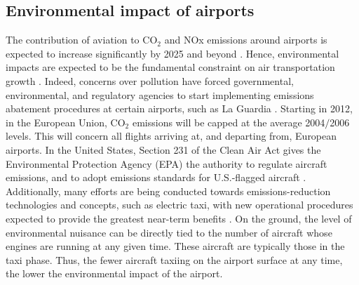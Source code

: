 \documentclass[letterpaper]{article}
\begin{document}
\subsection{Environmental impact of airports}
The contribution of aviation to CO$_{2}$ and NOx emissions around airports is expected to increase
 significantly by 2025 and beyond \cite{U.S.1999,Intergovernmental1999}. Hence, environmental impacts
 are expected to be the fundamental constraint on air transportation growth \cite{Waitz2004}.
  Indeed, concerns over pollution have forced governmental, environmental, and regulatory agencies to
   start implementing emissions abatement procedures at certain airports, such as La Guardia \cite{Boeing}.
   Starting in 2012, in the European Union, CO$_{2}$ emissions will be capped at the average 2004$/$2006 levels.
   This will concern all flights arriving at, and departing from, European airports.
   In the United States, Section 231 of the Clean Air Act gives the Environmental Protection Agency (EPA)
   the authority to regulate aircraft emissions, and to adopt emissions standards for U.S.-flagged aircraft \cite{United2003}.
   Additionally, many efforts are being conducted towards emissions-reduction technologies and concepts, such as electric taxi, with new operational
   procedures expected to provide the greatest near-term benefits \cite{Waitz2004}. On the ground, the level of environmental nuisance can be directly tied to the number of aircraft whose engines are running at any given time. These aircraft are typically those in the taxi phase. Thus, the fewer aircraft taxiing on the airport surface at any time, the lower the environmental impact of the airport.
\end{document}
